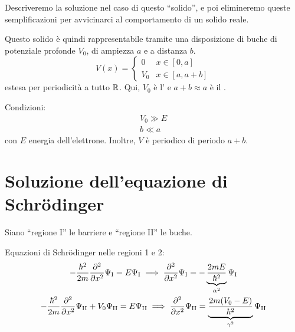 Descriveremo la soluzione nel caso di questo ``solido'', e poi elimineremo queste semplificazioni per avvicinarci al comportamento di un solido reale.

Questo solido è quindi rappresentabile tramite una disposizione di buche di potenziale profonde $V_0$, di ampiezza $a$ e a distanza $b$.
\begin{equation}
    V(x) = \begin{cases}
        0 & x \in [0, a] \\
        V_0 & x \in [a, a + b]
    \end{cases}
\end{equation}
estesa per periodicità a tutto $\mathbb{R}$.
Qui, $V_0$ è l' e $a + b \approx a$ è il .


Condizioni:
\begin{subequations}
\label{eq:condcristallo}
    \begin{gather}
        V_0 \gg E \\
        b \ll a
    \end{gather}
\end{subequations}
con $E$ energia dell'elettrone.
Inoltre, $V$ è periodico di periodo $a + b$.

\section{Soluzione dell'equazione di Schrödinger}

Siano ``regione I'' le barriere e ``regione II'' le buche.

Equazioni di Schrödinger nelle regioni 1 e 2:
\begin{subequations}
\label{eq:schrcristallo}
    \begin{gather}
        -\frac{\hbar^2}{2 m} \parder[][2]{x} \Psi_\mathrm{I} = E \Psi_\mathrm{I}
        \implies
        \parder[][2]{x} \Psi_\mathrm{I} = - \underbrace{\frac{2 m E}{\hbar^2}}_{\alpha^2} \Psi_\mathrm{I} \\
        -\frac{\hbar^2}{2 m} \parder[][2]{x} \Psi_\mathrm{II} + V_0 \Psi_\mathrm{II} = E \Psi_\mathrm{II}
        \implies
        \parder[][2]{x} \Psi_\mathrm{II} = \underbrace{\frac{2 m (V_0 - E)}{\hbar^2}}_{\gamma^2} \Psi_\mathrm{II}
    \end{gather}
\end{subequations}

